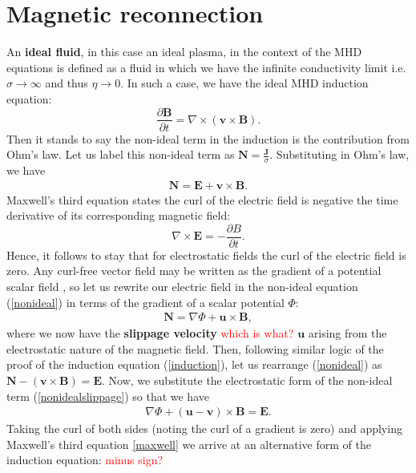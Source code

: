 \section{Magnetic reconnection}
An \textbf{ideal fluid}, in this case an ideal plasma, in the context of the MHD equations is defined as a fluid in which we have the infinite conductivity limit i.e. $\sigma \rightarrow \infty$ and thus $\eta\rightarrow 0$. In such a case, we have the ideal MHD induction equation: 
\begin{equation}
    \frac{\partial \mathbf{B}}{\partial t} = \nabla \times (\mathbf{v}\times\mathbf{B}).
\end{equation}
Then it stands to say the non-ideal term in the induction is the contribution from Ohm's law. Let us label this non-ideal term as $\mathbf{N}=\frac{\mathbf{J}}{\sigma}$. Substituting in Ohm's law, we have
\begin{align}
    \mathbf{N} = \mathbf{E} + \mathbf{v}\times\mathbf{B}. \label{nonideal}
\end{align}
Maxwell's third equation \cite{maxwell} states the curl of the electric field is negative the time derivative of its corresponding magnetic field:
\begin{equation}
    \nabla \times \mathbf{E} = -\frac{\partial B}{\partial t}. \label{maxwell}
\end{equation}
Hence, it follows to stay that for electrostatic fields the curl of the electric field is zero. Any curl-free vector field may be written as the gradient of a potential scalar field \cite{manogue_dray}, so let us rewrite our electric field in the non-ideal equation (\ref{nonideal}) in terms of the gradient of a scalar potential $\Phi$:
\begin{align}
    \mathbf{N} = \nabla\Phi + \mathbf{u}\times\mathbf{B}, \label{nonidealslippage}
\end{align}
where we now have the \textbf{slippage velocity} \textcolor{red}{which is what?} $\mathbf{u}$ arising from the electrostatic nature of the magnetic field. %
Then, following similar logic of the proof of the induction equation (\ref{induction}), let us rearrange (\ref{nonideal}) as $\mathbf{N}-(\mathbf{v}\times\mathbf{B})=\mathbf{E}$. Now, we substitute the electrostatic form of the non-ideal term (\ref{nonidealslippage}) so that we have 
\begin{align}
    \nabla\Phi + (\mathbf{u}-\mathbf{v})\times\mathbf{B} = \mathbf{E}. 
\end{align}
Taking the curl of both sides (noting the curl of a gradient is zero) and applying Maxwell's third equation \ref{maxwell} we arrive at an alternative form of the induction equation: \textcolor{red}{minus sign?}
